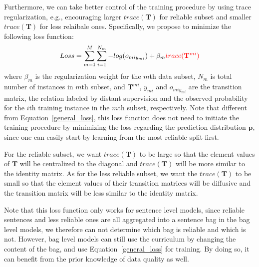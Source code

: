 Furthermore, we can take better control of the training procedure by using trace regularization, e.g., encouraging larger $trace(\mathbf{T})$ for reliable subset and smaller $trace(\mathbf{T})$ for less relaibale ones. 
Specifically, we propose to minimize the following  loss function:
%
\begin{equation}
\begin{aligned}
Loss=\sum_{m=1}^M{\sum_{i=1}^{N_m}{-log(o_{miy_{mi}})}} + \beta_m \textcolor{red}{trace(\mathbf{T}^{mi})}
\end{aligned}
\end{equation}
where $\beta_m$ is the regularization weight for the $m$th data subset, $N_m$ is total number of instances in $m$th subset, and  $\mathbf{T}^{mi}$, $y_{mi}$ and $o_{miy_{mi}}$ are the transition matrix, the relation labeled by distant supervision and the observed probability for the $i$th training instance in the $m$th subset, respectively. Note that different from Equation~\ref{general_loss}, this loss function does not need to initiate the training procedure by 
minimizing the loss regarding the prediction distribution $\mathbf{p}$, since one can easily start by learning from the most reliable split first. 

For the reliable subset, we want $trace(\mathbf{T})$ to be large   so that the element values of $\mathbf{T}$ will be centralized to the diagonal and $trace(\mathbf{T})$ will be more similar to the identity matrix. As for the  less reliable subset, we want the $trace(\mathbf{T})$ to be small  so that the element values of their transition matrices will be diffusive and the transition matrix will be less similar to the identity matrix. 

Note that this loss function only works for sentence level models, since reliable sentences and less reliable ones are all aggregated into a sentence bag in the bag level models,  we therefore can not determine which bag is reliable and which is not. However, bag level models can still use the curriculum by changing the content of the bag,   and use Equation~\ref{general_loss} for training. By doing so, it can benefit from the prior knowledge of data quality as well.



